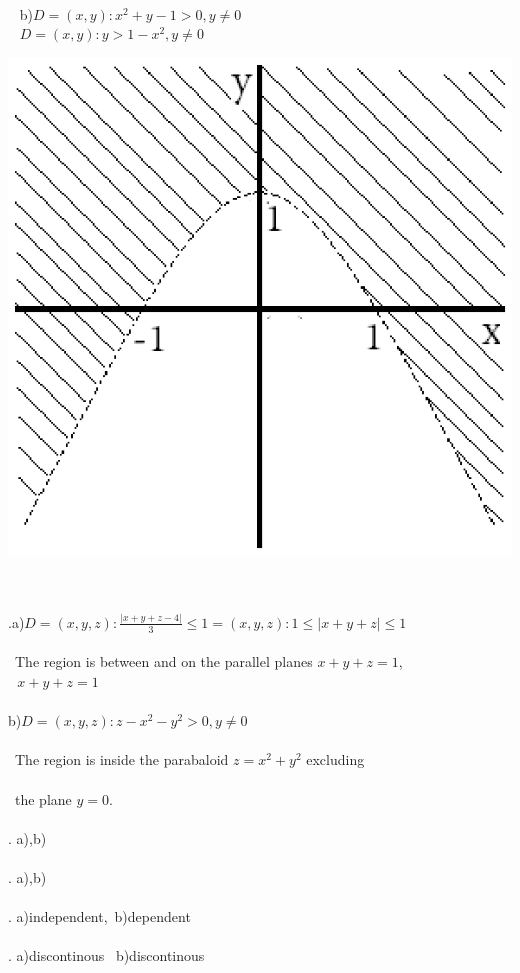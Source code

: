 \documentclass[11pt]{amsbook}
\begin{document}
	\\
	\begin{minipage}{0.6\textwidth}\raggedright
		\quad\,\,\ b)\quad $D = {(x, y): x^2 + y - 1 > 0, y \neq 0}$
		\\
		\quad\quad \quad\,\,\ $D = {(x, y): y > 1 - x^2 , y \neq 0}$
	\end{minipage}
	\hfill%
	\begin{minipage}{0.3\textwidth}
		\includegraphics[width=0.8\linewidth]{images/b2p2-278-4b.eps}
	\end{minipage}%
	\\\\
	.\quad a)\quad $D = {(x, y, z): \frac{|x+y+z-4|}{3} \leqslant 1} = {(x, y, z): 1 \leqslant |x+y+z| \leqslant 1}$
	\\\\\indent\indent\,
	The region is between and on the parallel planes $x+y+z = 1$, 
	\\\indent\indent\,\ $x+y+z = 1$
	\\\\\indent
	\! b)\quad $D = {(x, y, z): z - x^2 - y^2 > 0, y \neq 0}$
	\\\\\indent\indent\,
	The region is inside the parabaloid $z = x^2 + y^2$ excluding
	\\\\\indent\indent\,
	the plane $y = 0$.
	\\\\
	.\quad\!\! a),\qquad\qquad\qquad b)
	\\\\
	.\quad\!\!\!\! \!a),\qquad\qquad\qquad b)
	\\\\
	.\quad\!\!\!\!\! a)\quad independent,\quad\  \!b)\quad dependent
	\\\\
	.\quad\!\!\!\!\! a)\quad discontinous\quad\ \! b)\quad discontinous
	
\end{document}
